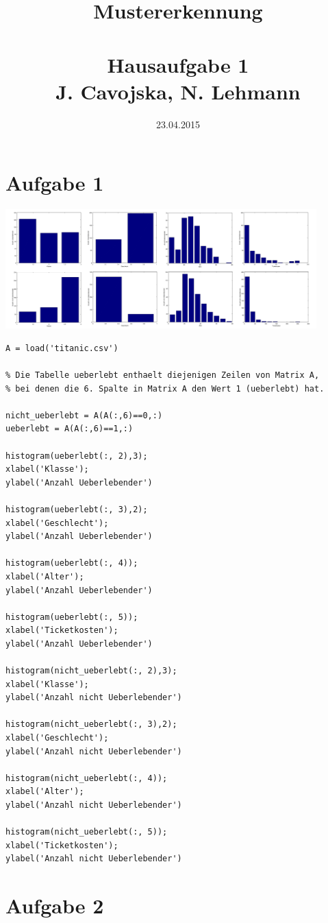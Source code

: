 \documentclass{article}
\title{Mustererkennung\\~\\Hausaufgabe 1\\ \small{J. Cavojska, N. Lehmann}}
\date{23.04.2015}
\begin{document}
\maketitle

\section*{Aufgabe 1}

\includegraphics[width=12cm]{Histograms.png}

\begin{verbatim}
A = load('titanic.csv')

% Die Tabelle ueberlebt enthaelt diejenigen Zeilen von Matrix A,
% bei denen die 6. Spalte in Matrix A den Wert 1 (ueberlebt) hat.

nicht_ueberlebt = A(A(:,6)==0,:)
ueberlebt = A(A(:,6)==1,:) 

histogram(ueberlebt(:, 2),3);
xlabel('Klasse');
ylabel('Anzahl Ueberlebender')

histogram(ueberlebt(:, 3),2);
xlabel('Geschlecht');
ylabel('Anzahl Ueberlebender')

histogram(ueberlebt(:, 4));
xlabel('Alter');
ylabel('Anzahl Ueberlebender')

histogram(ueberlebt(:, 5));
xlabel('Ticketkosten');
ylabel('Anzahl Ueberlebender')

histogram(nicht_ueberlebt(:, 2),3);
xlabel('Klasse');
ylabel('Anzahl nicht Ueberlebender')

histogram(nicht_ueberlebt(:, 3),2);
xlabel('Geschlecht');
ylabel('Anzahl nicht Ueberlebender')

histogram(nicht_ueberlebt(:, 4));
xlabel('Alter');
ylabel('Anzahl nicht Ueberlebender')

histogram(nicht_ueberlebt(:, 5));
xlabel('Ticketkosten');
ylabel('Anzahl nicht Ueberlebender')
\end{verbatim}

\section*{Aufgabe 2}
\end{document}
